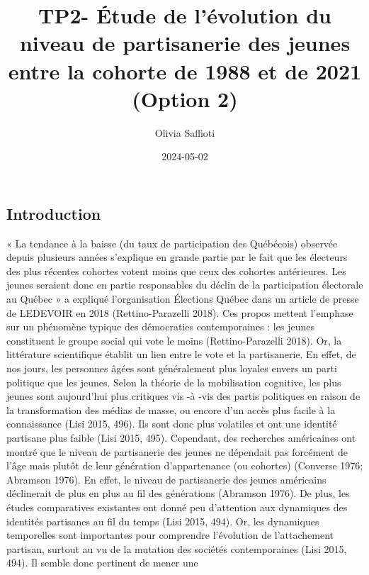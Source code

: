 \documentclass[
  letterpaper,
  DIV=11,
  numbers=noendperiod]{scrartcl}
\title{TP2- Étude de l'évolution du niveau de partisanerie des jeunes
entre la cohorte de 1988 et de 2021 (Option 2)}
\author{Olivia Saffioti}
\date{2024-05-02}
\begin{document}
\maketitle
\ifdefined\Shaded\renewenvironment{Shaded}{\begin{tcolorbox}[breakable, borderline west={3pt}{0pt}{shadecolor}, frame hidden, boxrule=0pt, interior hidden, sharp corners, enhanced]}{\end{tcolorbox}}\fi

\hypertarget{introduction}{%
\subsection{Introduction}\label{introduction}}

« La tendance à la baisse (du taux de participation des Québécois)
observée depuis plusieurs années s'explique en grande partie par le fait
que les électeurs des plus récentes cohortes votent moins que ceux des
cohortes antérieures. Les jeunes seraient donc en partie responsables du
déclin de la participation électorale au Québec » a expliqué
l'organisation Élections Québec dans un article de presse de LEDEVOIR en
2018 (Rettino-Parazelli 2018). Ces propos mettent l'emphase sur un
phénomène typique des démocraties contemporaines : les jeunes
constituent le groupe social qui vote le moins (Rettino-Parazelli 2018).
Or, la littérature scientifique établit un lien entre le vote et la
partisanerie. En effet, de nos jours, les personnes âgées sont
généralement plus loyales envers un parti politique que les jeunes.
Selon la théorie de la mobilisation cognitive, les plus jeunes sont
aujourd'hui plus critiques vis -à -vis des partis politiques en raison
de la transformation des médias de masse, ou encore d'un accès plus
facile à la connaissance (Lisi 2015, 496). Ils sont donc plus volatiles
et ont une identité partisane plus faible (Lisi 2015, 495). Cependant,
des recherches américaines ont montré que le niveau de partisanerie des
jeunes ne dépendait pas forcément de l'âge mais plutôt de leur
génération d'appartenance (ou cohortes) (Converse 1976; Abramson 1976).
En effet, le niveau de partisanerie des jeunes américains déclinerait de
plus en plus au fil des générations (Abramson 1976). De plus, les études
comparatives existantes ont donné peu d'attention aux dynamiques des
identités partisanes au fil du temps (Lisi 2015, 494). Or, les
dynamiques temporelles sont importantes pour comprendre l'évolution de
l'attachement partisan, surtout au vu de la mutation des sociétés
contemporaines (Lisi 2015, 494). Il semble donc pertinent de mener une
\end{document}
